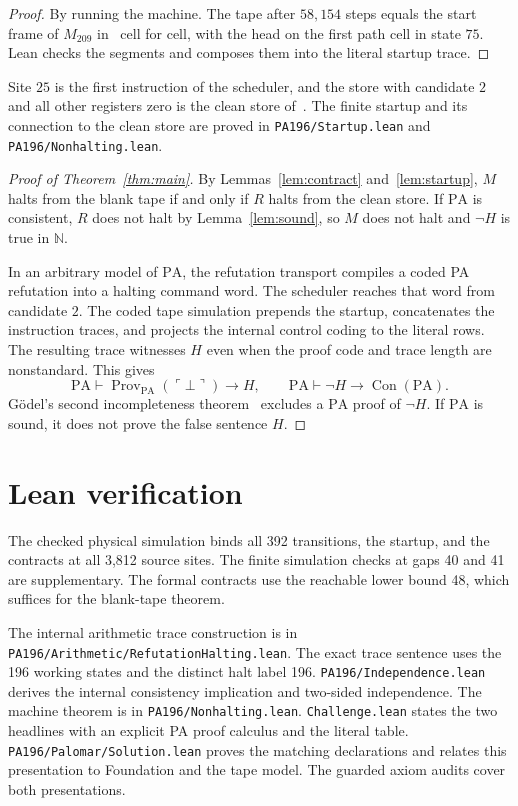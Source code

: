 \documentclass[11pt,letterpaper]{article}
\newcommand{\PA}{\mathrm{PA}}
\newcommand{\N}{\mathbb{N}}
\newcommand{\Con}{\operatorname{Con}}
\newcommand{\Prov}{\operatorname{Prov}}
\newcommand{\file}[1]{\texttt{\nolinkurl{#1}}}
\begin{document}
\begin{proof}
By running the machine. The tape after $58{,}154$ steps equals the
start frame of $M_{209}$ in~\cite[\S2]{pa209} cell for cell, with the
head on the first path cell in state $75$. Lean checks the
segments and composes them into the literal startup trace.
\end{proof}

Site $25$ is the first instruction of the scheduler, and the store
with candidate $2$ and all other registers zero is the clean store
of~\cite{pa209}. The finite startup and its connection to the clean
store are proved in \file{PA196/Startup.lean} and
\file{PA196/Nonhalting.lean}.

\begin{proof}[Proof of Theorem~\ref{thm:main}]
By Lemmas~\ref{lem:contract} and~\ref{lem:startup}, $M$ halts from the
blank tape if and only if $R$ halts from the clean store. If $\PA$ is
consistent, $R$ does not halt by Lemma~\ref{lem:sound}, so $M$ does
not halt and $\neg H$ is true in $\N$.

In an arbitrary model of $\PA$, the refutation transport compiles a
coded PA refutation into a halting command word. The scheduler reaches
that word from candidate $2$. The coded tape simulation prepends the
startup, concatenates the instruction traces, and projects the internal
control coding to the literal rows. The resulting trace witnesses $H$
even when the proof code and trace length are nonstandard. This gives
\[
   \PA\vdash \Prov_{\PA}(\ulcorner\bot\urcorner)\to H,
   \qquad
   \PA\vdash \neg H\to\Con(\PA).
\]
G\"odel's second incompleteness theorem~\cite{goedel} excludes a
$\PA$ proof of $\neg H$. If $\PA$ is sound, it does not prove the
false sentence $H$.
\end{proof}

\section{Lean verification}\label{sec:status}

The checked physical simulation binds all 392 transitions, the startup,
and the contracts at all 3,812 source sites. The finite simulation
checks at gaps 40 and 41 are supplementary. The formal contracts use
the reachable lower bound 48, which suffices for the blank-tape theorem.

The internal arithmetic trace construction is in
\file{PA196/Arithmetic/RefutationHalting.lean}. The exact trace sentence
uses the 196 working states and the distinct halt label 196.
\file{PA196/Independence.lean} derives the internal consistency
implication and two-sided independence. The machine theorem is in
\file{PA196/Nonhalting.lean}. \file{Challenge.lean} states the two
headlines with an explicit PA proof calculus and the literal table.
\file{PA196/Palomar/Solution.lean} proves the matching declarations and
relates this presentation to Foundation and the tape model. The
guarded axiom audits cover both presentations.
\end{document}
